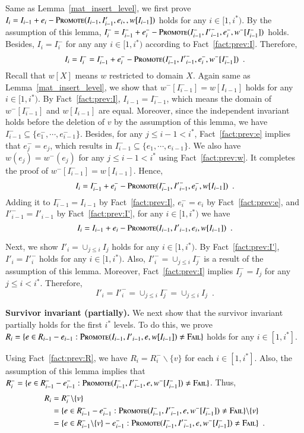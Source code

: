 \documentclass[11pt]{article}
\newcommand{\err}{{\textsc{Fail}}}
\newcommand{\replacementTester}{\textsc{Promote}}
\begin{document}
Same as Lemma~\ref{mat_insert_level}, we first prove $I_i = I_{i-1} + e_i - \replacementTester{}(I_{i-1}, I'_{i-1}, e_i,, w[I_{i - 1}])$ holds for any $i\in[1,i^*)$.
By the assumption of this lemma, $I_{i}^-=I_{i - 1}^- + e_i^- - \replacementTester{}(I_{i - 1}^-, {I'}_{i - 1}^-, e_i^-, w^-[I_{i - 1}^-])$ holds.
Besides, $I_i = I_i^-$  for any any $i\in[1,i^*)$ according to Fact~\ref{fact:prev:I}.
Therefore,
$$ I_i = I_i^- = I_{i - 1}^- + e_i^- - \replacementTester{}(I_{i - 1}^-, {I'}_{i - 1}^-, e_i^-, w^-[I_{i - 1}^-])  \enspace.
$$
Recall that $w[X]$ means $w$ restricted to domain $X$.
Again same as Lemma~\ref{mat_insert_level}, we show that $w^-[I_{i - 1}^-]=w[I_{i - 1}]$ holds for any $i\in[1,i^*)$.
By Fact~\ref{fact:prev:I}, $I_{i-1} = I_{i-1}^-$, which means the domain of $w^-[I_{i - 1}^-]$ and $w[I_{i - 1}]$ are equal.
Moreover, since the independent invariant holds before the deletion of $v$ by the assumption of this lemma, we have $I_{i - 1}^- \subseteq \{e_1^-, \cdots, e_{i - 1}^-\}$.
Besides, for any $j\leq i-1 <i^*$, Fact~\ref{fact:prev:e} implies that $e_j^-=e_j$, which results in $I_{i - 1}^- \subseteq \{e_1, \cdots, e_{i - 1}\}$.
We also have $w(e_j)=w^-(e_j)$ for any $j\leq i-1 <i^*$ using Fact~\ref{fact:prev:w}. It completes the proof of $w^-[I_{i - 1}^-]=w[I_{i - 1}]$.
Hence,
$$
I_i = I_{i - 1}^- + e_i^- - \replacementTester{}(I_{i - 1}^-, {I'}_{i - 1}^-, e_i^-, w[I_{i - 1}]) \enspace.
$$
Adding it to $I_{i - 1}^-=I_{i - 1}$ by Fact~\ref{fact:prev:I}, 
$e_i^-=e_i$ by Fact~\ref{fact:prev:e}, 
and ${I'}_{i - 1}^-={I'}_{i - 1}$ by Fact~\ref{fact:prev:I'},
for any $i\in[1,i^*)$ we have
$$
I_i = I_{i - 1} + e_i - \replacementTester{}(I_{i - 1},  {I'}_{i - 1}, e_i, w[I_{i - 1}]) \enspace.
$$

Next, we show $I'_i = \cup_{j \le i} I_j$ holds for any $i\in[1,i^*)$.
By Fact~\ref{fact:prev:I'}, ${I'}_i =  {I'}_i^-$  holds for any $i\in[1,i^*)$.
Also, ${I'}_i^- = \cup_{j \le i} I_j^-$ is a result of the assumption of this lemma.
Moreover, Fact~\ref{fact:prev:I} implies $I_j^-=I_j$ for any $j\leq i <i^*$.
Therefore, 
$$
{I'}_i =  {I'}_i^- = \cup_{j \le i} I_j^- = \cup_{j \le i} I_j  \enspace.
$$

\textbf{Survivor invariant (partially). }
We next show that the survivor invariant partially holds for the first $i^*$ levels.
To do this, we prove
$R_i = \{ e \in R_{i-1} - e_{i-1}: \replacementTester{}(I_{i-1}, {I'}_{i-1}, e, w[I_{i - 1}]) \ne \err\}$ holds for any $i\in[1,i^*]$.

Using Fact~\ref{fact:prev:R},  we have $R_i = R_i^- \backslash \{v\}$ for each $i \in [1, i^*]$.
Also, the assumption of this lemma implies that 
$R_i^- = \{ e \in R_{i-1}^- - e_{i-1}^-: \replacementTester{}(I_{i-1}^-, {I'}_{i-1}^-, e, w^-[I_{i-1}^-]) \ne \err\}$. Thus,
\begin{align*}
    R_i &= R_i^- \backslash \{v\} \\
    &= \{ e \in R_{i-1}^- - e_{i-1}^-: \replacementTester{}(I_{i-1}^-, {I'}_{i-1}^-, e, w^-[I_{i-1}^-]) \ne \err\} \backslash \{v\} \\
    &= \{ e \in R_{i-1}^- \backslash \{v\} - e_{i-1}^-: \replacementTester{}(I_{i-1}^-, {I'}_{i-1}^-, e, w^-[I_{i-1}^-]) \ne \err\} \enspace.
\end{align*}
\end{document}
